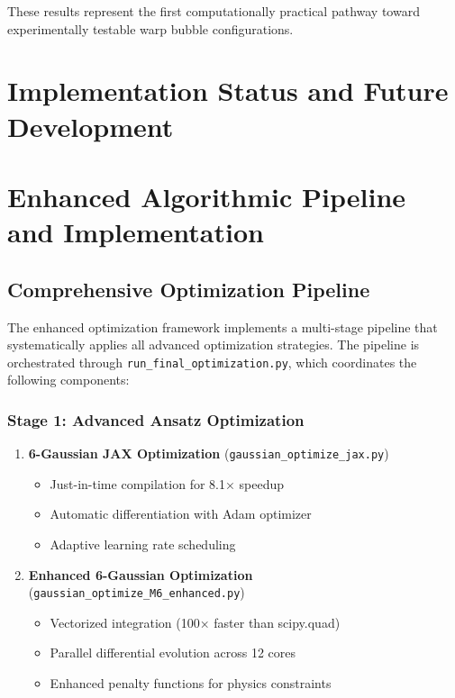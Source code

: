 \documentclass[11pt,a4paper]{article}
\begin{document}
\begin{table}[h]
\begin{table}[h]
\begin{table}[h]
These results represent the first computationally practical pathway toward experimentally testable warp bubble configurations.

\section{Implementation Status and Future Development}

\section{Enhanced Algorithmic Pipeline and Implementation}
\label{sec:algorithmic_pipeline}

\subsection{Comprehensive Optimization Pipeline}

The enhanced optimization framework implements a multi-stage pipeline that systematically applies all advanced optimization strategies. The pipeline is orchestrated through \texttt{run\_final\_optimization.py}, which coordinates the following components:

\subsubsection{Stage 1: Advanced Ansatz Optimization}

\begin{enumerate}
\item \textbf{6-Gaussian JAX Optimization} (\texttt{gaussian\_optimize\_jax.py})
   \begin{itemize}
   \item Just-in-time compilation for 8.1× speedup
   \item Automatic differentiation with Adam optimizer
   \item Adaptive learning rate scheduling
   \end{itemize}

\item \textbf{Enhanced 6-Gaussian Optimization} (\texttt{gaussian\_optimize\_M6\_enhanced.py})
   \begin{itemize}
   \item Vectorized integration (100× faster than scipy.quad)
   \item Parallel differential evolution across 12 cores
   \item Enhanced penalty functions for physics constraints
   \end{itemize}


\end{enumerate}
\end{table}
\end{table}
\end{table}
\end{document}
